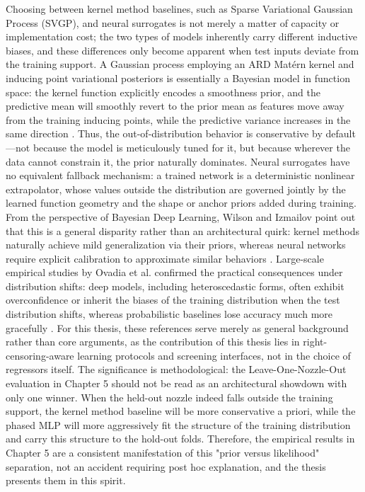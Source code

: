 Choosing between kernel method baselines, such as Sparse Variational Gaussian Process (SVGP), and neural surrogates is not merely a matter of capacity or implementation cost; the two types of models inherently carry different inductive biases, and these differences only become apparent when test inputs deviate from the training support.
A Gaussian process employing an ARD Mat\'ern kernel and inducing point variational posteriors is essentially a Bayesian model in function space: the kernel function explicitly encodes a smoothness prior, and the predictive mean will smoothly revert to the prior mean as features move away from the training inducing points, while the predictive variance increases in the same direction \cite{RasmussenWilliams2006,HensmanFusiLawrence2013}.
Thus, the out-of-distribution behavior is conservative by default---not because the model is meticulously tuned for it, but because wherever the data cannot constrain it, the prior naturally dominates.
Neural surrogates have no equivalent fallback mechanism: a trained network is a deterministic nonlinear extrapolator, whose values outside the distribution are governed jointly by the learned function geometry and the shape or anchor priors added during training.
From the perspective of Bayesian Deep Learning, Wilson and Izmailov point out that this is a general disparity rather than an architectural quirk: kernel methods naturally achieve mild generalization via their priors, whereas neural networks require explicit calibration to approximate similar behaviors \cite{WilsonIzmailov2020BDL}.
Large-scale empirical studies by Ovadia et al. confirmed the practical consequences under distribution shifts: deep models, including heteroscedastic forms, often exhibit overconfidence or inherit the biases of the training distribution when the test distribution shifts, whereas probabilistic baselines lose accuracy much more gracefully \cite{Ovadia2019Trust}.
For this thesis, these references serve merely as general background rather than core arguments, as the contribution of this thesis lies in right-censoring-aware learning protocols and screening interfaces, not in the choice of regressors itself.
The significance is methodological: the Leave-One-Nozzle-Out evaluation in Chapter 5 should not be read as an architectural showdown with only one winner.
When the held-out nozzle indeed falls outside the training support, the kernel method baseline will be more conservative a priori, while the phased MLP will more aggressively fit the structure of the training distribution and carry this structure to the hold-out folds.
Therefore, the empirical results in Chapter 5 are a consistent manifestation of this "prior versus likelihood" separation, not an accident requiring post hoc explanation, and the thesis presents them in this spirit.

